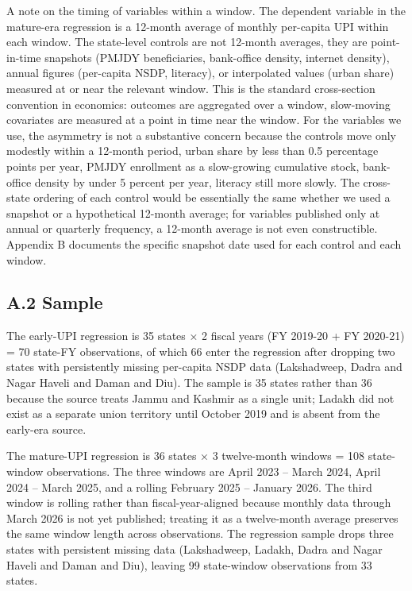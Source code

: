 \documentclass[
]{article}
\begin{document}
A note on the timing of variables within a window. The dependent
variable in the mature-era regression is a 12-month average of monthly
per-capita UPI within each window. The state-level controls are not
12-month averages, they are point-in-time snapshots (PMJDY
beneficiaries, bank-office density, internet density), annual figures
(per-capita NSDP, literacy), or interpolated values (urban share)
measured at or near the relevant window. This is the standard
cross-section convention in economics: outcomes are aggregated over a
window, slow-moving covariates are measured at a point in time near the
window. For the variables we use, the asymmetry is not a substantive
concern because the controls move only modestly within a 12-month
period, urban share by less than 0.5 percentage points per year, PMJDY
enrollment as a slow-growing cumulative stock, bank-office density by
under 5 percent per year, literacy still more slowly. The cross-state
ordering of each control would be essentially the same whether we used a
snapshot or a hypothetical 12-month average; for variables published
only at annual or quarterly frequency, a 12-month average is not even
constructible. Appendix B documents the specific snapshot date used for
each control and each window.

\subsection{A.2 Sample}\label{a.2-sample}

The early-UPI regression is 35 states × 2 fiscal years (FY 2019-20 + FY
2020-21) = 70 state-FY observations, of which 66 enter the regression
after dropping two states with persistently missing per-capita NSDP data
(Lakshadweep, Dadra and Nagar Haveli and Daman and Diu). The sample is
35 states rather than 36 because the source treats Jammu and Kashmir as
a single unit; Ladakh did not exist as a separate union territory until
October 2019 and is absent from the early-era source.

The mature-UPI regression is 36 states × 3 twelve-month windows = 108
state-window observations. The three windows are April 2023 -- March
2024, April 2024 -- March 2025, and a rolling February 2025 -- January
2026. The third window is rolling rather than fiscal-year-aligned
because monthly data through March 2026 is not yet published; treating
it as a twelve-month average preserves the same window length across
observations. The regression sample drops three states with persistent
missing data (Lakshadweep, Ladakh, Dadra and Nagar Haveli and Daman and
Diu), leaving 99 state-window observations from 33 states.
\end{document}
